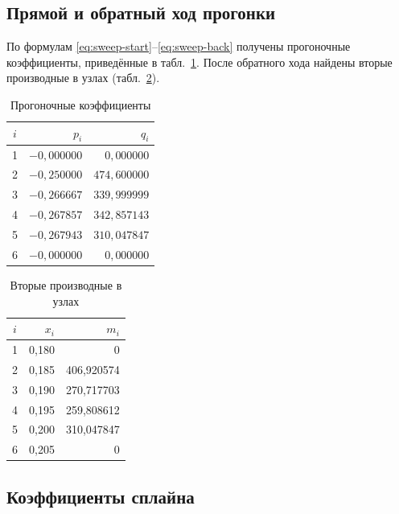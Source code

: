 \documentclass[14pt,a4paper]{extarticle}
\begin{document}
\subsection{Прямой и обратный ход прогонки}

По формулам \eqref{eq:sweep-start}--\eqref{eq:sweep-back} получены
прогоночные коэффициенты, приведённые в табл.~\ref{tab:sweep}.
После обратного хода найдены вторые производные в узлах
(табл.~\ref{tab:m}).

\begin{table}[H]
    \centering
    \caption{Прогоночные коэффициенты}
    \label{tab:sweep}
    \small
    \begin{tabular}{crr}
        \toprule
        $i$ & $p_i$ & $q_i$\\
        \midrule
        1 & $-0{,}000000$ & $0{,}000000$\\
        2 & $-0{,}250000$ & $474{,}600000$\\
        3 & $-0{,}266667$ & $339{,}999999$\\
        4 & $-0{,}267857$ & $342{,}857143$\\
        5 & $-0{,}267943$ & $310{,}047847$\\
        6 & $-0{,}000000$ & $0{,}000000$\\
        \bottomrule
    \end{tabular}
\end{table}

\begin{table}[H]
    \centering
    \caption{Вторые производные в узлах}
    \label{tab:m}
    \begin{tabular}{crr}
        \toprule
        $i$ & $x_i$ & $m_i$\\
        \midrule
        1 & 0{,}180 & 0\\
        2 & 0{,}185 & 406{,}920574\\
        3 & 0{,}190 & 270{,}717703\\
        4 & 0{,}195 & 259{,}808612\\
        5 & 0{,}200 & 310{,}047847\\
        6 & 0{,}205 & 0\\
        \bottomrule
    \end{tabular}
\end{table}

\subsection{Коэффициенты сплайна}
\end{document}
